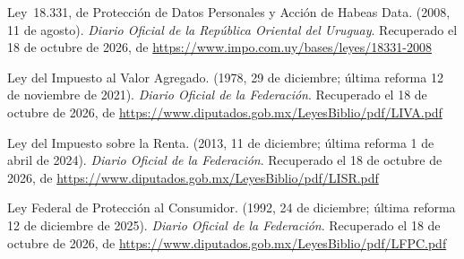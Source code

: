 \documentclass[12pt, a4paper]{article}
\begin{document}
\begin{list}{}{\setlength{\leftmargin}{1.27cm}\setlength{\itemindent}{-1.27cm}%
  \setlength{\labelwidth}{0pt}\setlength{\labelsep}{0pt}\setlength{\itemsep}{6pt}}

\item Ley~18.331, de Protección de Datos Personales y Acción de
  Habeas Data. (2008, 11 de agosto). \textit{Diario Oficial de la
  República Oriental del Uruguay}.
  Recuperado el 18 de octubre de 2026, de \url{https://www.impo.com.uy/bases/leyes/18331-2008}



\item Ley del Impuesto al Valor Agregado. (1978, 29 de diciembre;
  última reforma 12 de noviembre de 2021). \textit{Diario Oficial de la Federación}. Recuperado el 18 de octubre de 2026, de \url{https://www.diputados.gob.mx/LeyesBiblio/pdf/LIVA.pdf}
 
 
\item Ley del Impuesto sobre la Renta. (2013, 11 de diciembre;
  última reforma 1 de abril de 2024). \textit{Diario Oficial de la Federación}.
Recuperado el 18 de octubre de 2026, de \url{https://www.diputados.gob.mx/LeyesBiblio/pdf/LISR.pdf}
 
 
\item Ley Federal de Protección al Consumidor. (1992, 24 de diciembre;
  última reforma 12 de diciembre de 2025). \textit{Diario Oficial de la Federación}.
Recuperado el 18 de octubre de 2026, de \url{https://www.diputados.gob.mx/LeyesBiblio/pdf/LFPC.pdf}
 


\end{list}
\end{document}
